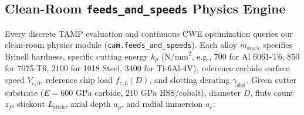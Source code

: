 \documentclass[conference]{IEEEtran}
\begin{document}
\subsection{Clean-Room \texttt{feeds\_and\_speeds} Physics Engine}
\label{sec:feeds_speeds}
Every discrete TAMP evaluation and continuous CWE optimization queries our clean-room physics module (\texttt{cam.feeds\_and\_speeds}). Each alloy $m_{\text{stock}}$ specifies Brinell hardness, specific cutting energy $k_p$ ($\text{N/mm}^2$, e.g., $700$ for Al 6061-T6, $850$ for 7075-T6, $2100$ for 1018 Steel, $3400$ for Ti-6Al-4V), reference carbide surface speed $V_{c,0}$, reference chip load $f_{z,0}(D)$, and slotting derating $\gamma_{\text{slot}}$. Given cutter substrate ($E = 600\text{ GPa}$ carbide, $210\text{ GPa}$ HSS/cobalt), diameter $D$, flute count $z_f$, stickout $L_{\text{stick}}$, axial depth $a_p$, and radial immersion $a_e$:
\end{document}
